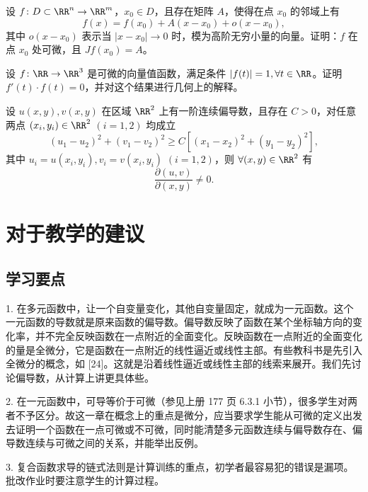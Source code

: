 \begin{xexercise}[1]
设 $f\colon D\subset\RR^n\to\RR^m$，$x_0\in D$，且存在矩阵 $A$，使得在点 $x_0$ 的邻域上有
  \[
    f(x)=f(x_0)+A(x-x_0)+o(x-x_0),
  \]
  其中 $o(x-x_0)$ 表示当 $|x-x_0|\to0$ 时，模为高阶无穷小量的向量。证明：$f$ 在点 $x_0$ 处可微，且 $Jf(x_0)=A$。
\end{xexercise}

\begin{xexercise}[2]
设 $f\colon\RR\to\RR^3$ 是可微的向量值函数，满足条件 $|f(t)|=1,\forall t\in\RR$。证明 $f'(t)\cdot f(t)=0$，并对这个结果进行几何上的解释。
\end{xexercise}

\begin{xexercise}[3]
设 $u(x,y),v(x,y)$ 在区域 $\RR^2$ 上有一阶连续偏导数，且存在 $C>0$，对任意两点 $(x_i,y_i)\in\RR^2$ $(i=1,2)$ 均成立
  \[
    (u_1-u_2)^2+(v_1-v_2)^2\ge C[(x_1-x_2)^2+(y_1-y_2)^2],
  \]
  其中 $u_i=u(x_i,y_i),v_i=v(x_i,y_i)$ $(i=1,2)$，则 $\forall(x,y)\in\RR^2$ 有
  \[
    \frac{\partial(u,v)}{\partial(x,y)}\ne0.
  \]
\end{xexercise}

\section{对于教学的建议}

\subsection{学习要点}

1. 在多元函数中，让一个自变量变化，其他自变量固定，就成为一元函数。这个一元函数的导数就是原来函数的偏导数。偏导数反映了函数在某个坐标轴方向的变化率，并不完全反映函数在一点附近的全面变化。反映函数在一点附近的全面变化的量是全微分，它是函数在一点附近的线性逼近或线性主部。有些教科书是先引入全微分的概念，如 [24]。这就是沿着线性逼近或线性主部的线索来展开。我们先讨论偏导数，从计算上讲更具体些。

2. 在一元函数中，可导等价于可微（参见上册 177 页 6.3.1 小节），很多学生对两者不予区分。故这一章在概念上的重点是微分，应当要求学生能从可微的定义出发去证明一个函数在一点可微或不可微，同时能清楚多元函数连续与偏导数存在、偏导数连续与可微之间的关系，并能举出反例。

3. 复合函数求导的链式法则是计算训练的重点，初学者最容易犯的错误是漏项。批改作业时要注意学生的计算过程。

